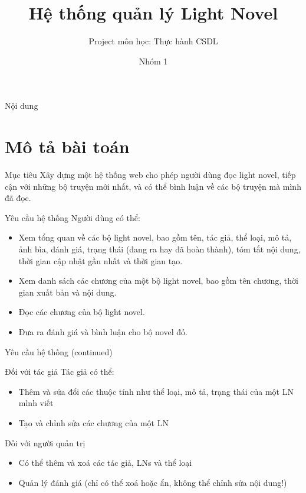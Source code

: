 \documentclass[12pt,aspectratio=169,handout]{beamer}
\title[HTQL Light Novel]{Hệ thống quản lý Light Novel}
\subtitle{Project môn học: Thực hành CSDL}
\author{Nhóm 1}
\institute{Đại học Bách Khoa Hà Nội}
\begin{document}
\titlepage

\begin{frame}{Nội dung}
    \tableofcontents[pausesections]
\end{frame}


\section{Mô tả bài toán}
\begin{frame}{Mục tiêu}
    Xây dựng một hệ thống web cho phép người dùng đọc light novel, tiếp cận với những bộ truyện mới nhất, và có thể bình luận về các bộ truyện mà mình đã đọc.
    \begin{block}{Yêu cầu hệ thống}
        Người dùng có thể:
        \begin{itemize}
            \item Xem tổng quan về các bộ light novel, bao gồm tên, tác giả, thể loại, mô tả, ảnh bìa, đánh giá, trạng thái (đang ra hay đã hoàn thành), tóm tắt nội dung, thời gian cập nhật gần nhất và thời gian tạo.
            \item Xem danh sách các chương của một bộ light novel, bao gồm tên chương, thời gian xuất bản và nội dung.
            \item Đọc các chương của bộ light novel.
            \item Đưa ra đánh giá và bình luận cho bộ novel đó.
        \end{itemize}
    \end{block}
\end{frame}

\begin{frame}{Yêu cầu hệ thống (continued)}
    \begin{block}{Đối với tác giả}
        Tác giả có thể:
        \begin{itemize}
            \item Thêm và sửa đổi các thuộc tính như thể loại, mô tả, trạng thái của một LN mình viết 
            \item Tạo và chỉnh sửa các chương của một LN 
        \end{itemize}
    \end{block}
    \pause
    \begin{block}{Đối với người quản trị}
        \begin{itemize}
            \item Có thể thêm và xoá các tác giả, LNs và thể loại
            \item Quản lý đánh giá (chỉ có thể xoá hoặc ẩn, không thể chỉnh sửa nội dung!)
        \end{itemize}
    \end{block}
\end{frame}
\end{document}
